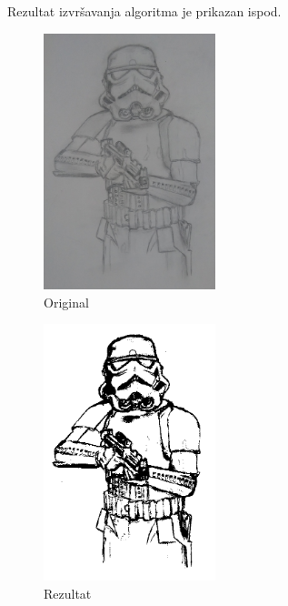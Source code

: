 \documentclass[12pt,a4paper]{article}
\theoremstyle{definition}
\theoremstyle{remark}
\theoremstyle{plain}
\begin{document}
Rezultat izvr\v savanja algoritma je prikazan ispod.
\begin{multicols}{2}
\begin{figure}[H]
\centering
\includegraphics[width=5cm]{images/storm_trooper.jpg}
  \caption{Original}\label{storm_trooper_input}
\end{figure}
\columnbreak
\begin{figure}[H]
\centering
\includegraphics[width=5cm]{images/storm_trooper_binarized_fcm.png}
  \caption{Rezultat}
\end{figure}
\end{multicols}
\end{document}
